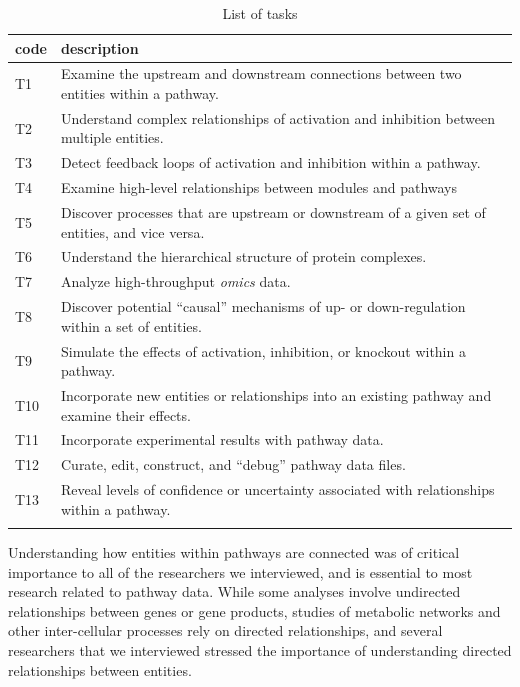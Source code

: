 \documentclass[review,journal]{vgtc}         %
\newcounter{task}
\begin{document}
\begin{table}[h]

\caption{List of tasks}

\begin{tabular}{p{0.5cm}p{7cm}}
\hline
code & description \\
\hline
T1 & Examine   the   upstream   and   downstream   connections between two entities within a pathway.\\
T2 & Understand   complex   relationships   of   activation   and inhibition between multiple entities.\\
T3 & Detect feedback loops of activation and inhibition within a pathway.\\
T4 & Examine  high-level  relationships  between  modules  and pathways\\
T5 & Discover processes that are upstream or downstream of a given set of entities, and vice versa.\\
T6 & Understand the hierarchical structure of protein complexes.\\
T7 & Analyze high-throughput \emph{omics} data.\\
T8 & Discover potential ``causal'' mechanisms of up- or down-regulation within a set of entities.\\
T9 &  Simulate the effects of activation,  inhibition,  or knockout within a pathway.\\
T10 & Incorporate new entities or relationships into an existing pathway and examine their effects.\\
T11 & Incorporate experimental results with pathway data.\\
T12 & Curate, edit, construct, and “debug” pathway data files. \\
T13 & Reveal levels of confidence or uncertainty associated with relationships within a pathway. \\
\hline

\label{table:tasks}

\end{tabular}

\end{table}


Understanding how entities within pathways are connected was of critical importance to all of the researchers we interviewed, and is essential to most research related to pathway data. While some analyses involve undirected relationships between genes or gene products, studies of metabolic networks and other inter-cellular processes rely on directed relationships, and several researchers that we interviewed stressed the importance of understanding directed relationships between entities. 
\end{document}
